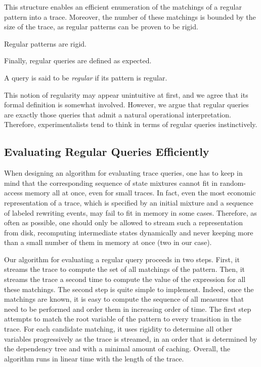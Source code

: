 \documentclass[runningheads]{llncs}
\begin{document}
This structure enables an efficient enumeration of the matchings of a
regular pattern into a trace. Moreover, the number of these matchings
is bounded by the size of the trace, as regular patterns can be proven
to be rigid.
\begin{proposition}\label{prop:regular-rigid}
  Regular patterns are rigid.
\end{proposition}
Finally, regular queries are defined as expected.
\begin{definition}
  A query is said to be \emph{regular} if its pattern is regular.
\end{definition}
This notion of regularity may appear unintuitive at first, and we
agree that its formal definition is somewhat involved. However, we
argue that regular queries are exactly those queries that admit a
natural operational interpretation. Therefore, experimentalists tend
to think in terms of regular queries instinctively.


\subsection{Evaluating Regular Queries
  Efficiently}\label{subsec:evalq}

When designing an algorithm for evaluating trace queries, one has to
keep in mind that the corresponding sequence of state mixtures cannot
fit in random-access memory all at once, even for small traces. In
fact, even the most economic representation of a trace, which is
specified by an initial mixture and a sequence of labeled rewriting
events, may fail to fit in memory in some cases. Therefore, as often
as possible, one should only be allowed to stream such a
representation from disk, recomputing intermediate states dynamically
and never keeping more than a small number of them in memory at once
(two in our case).

Our algorithm for evaluating a regular query proceeds in two
steps. First, it streams the trace to compute the set of all matchings
of the pattern. Then, it streams the trace a second time to compute
the value of the expression for all these matchings. The second step
is quite simple to implement. Indeed, once the matchings are known, it
is easy to compute the sequence of all measures that need to be
performed and order them in increasing order of time. The first step
attempts to match the root variable of the pattern to every transition
in the trace. For each candidate matching, it uses rigidity to
determine all other variables progressively as the trace is streamed,
in an order that is determined by the dependency tree and with a
minimal amount of caching. Overall, the algorithm runs in linear time 
with the length of the trace.
\end{document}
